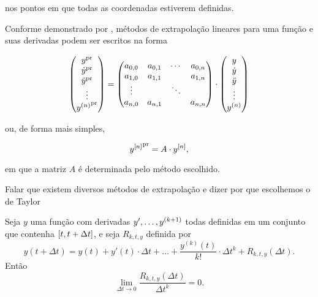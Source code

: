 nos pontos em que todas as coordenadas estiverem definidas.

Conforme demonstrado por , métodos de extrapolação lineares para uma função e suas derivadas podem ser escritos na forma

\[
\begin{pmatrix}
	\predicted{y} \\
	\predicted{\deriv{1}{y}} \\
	\predicted{\deriv{2}{y}} \\
	\vdots \\
	\predicted{\deriv{n}{y}}
\end{pmatrix}
=
\begin{pmatrix}
	a_{0,0} & a_{0,1} & \cdots & a_{0,n} \\
	a_{1,0} & a_{1,1} &  & a_{1,n} \\
    \vdots & & \ddots & \\
    a_{n,0} & a_{n,1} & & a_{n,n}
\end{pmatrix}
\cdot
\begin{pmatrix}
	y \\
	\deriv{1}{y} \\
	\deriv{2}{y} \\
	\vdots \\
	\deriv{n}{y}
\end{pmatrix}
\]

ou, de forma mais simples,

\begin{equation}
	\predicted{\drvec{n}{y}} = A \cdot \drvec{n}{y},
\end{equation}

em que a matriz \(A\) é determinada pelo método escolhido.

\alert{Falar que existem diversos métodos de extrapolação e dizer por que escolhemos o de Taylor}

\begin{theorem} \label{theo:taylor}
	Seja \(y\) uma função com derivadas \(y',\dots,y^{\pqty{k+1}}\) todas definidas em um conjunto que contenha \(\bqty{t, t+\Delta t}\), e seja \(R_{k, t, y}\) definida por
    \begin{equation*}
    	y(t + \Delta t) = y(t) + y'(t)\cdot\Delta t + \dots + \dfrac{y^{(k)}(t)}{k!}\cdot\Delta t^k + R_{k, t, y}(\Delta t).
    \end{equation*}
    Então
    \begin{equation} \label{eq:remainder_limit}
    	\lim_{\Delta t \rightarrow 0} \dfrac{R_{k, t, y}(\Delta t)}{\Delta t^k} = 0.
    \end{equation}
\end{theorem}

